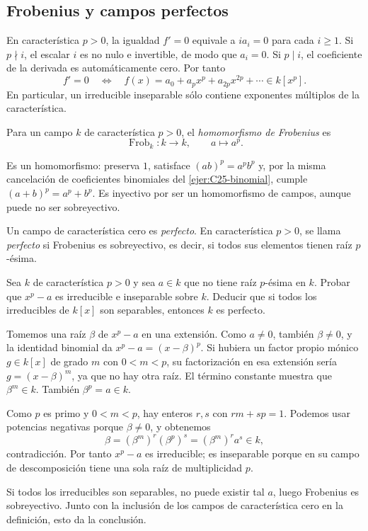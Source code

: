 \subsection{Frobenius y campos perfectos}\label{tema:25-3-1}\label{tema:25-3-2}
En característica $p>0$, la igualdad $f'=0$ equivale a $ia_i=0$ para cada $i\geq1$. Si $p\nmid i$, el escalar $i$ es no nulo e invertible, de modo que $a_i=0$. Si $p\mid i$, el coeficiente de la derivada es automáticamente cero. Por tanto
\[
f'=0\quad\Longleftrightarrow\quad
f(x)=a_0+a_px^p+a_{2p}x^{2p}+\cdots\in k[x^p].
\]
En particular, un irreducible inseparable sólo contiene exponentes múltiplos de la característica.

\begin{defi}
Para un campo $k$ de característica $p>0$, el \emph{homomorfismo de Frobenius} es
\[
\operatorname{Frob}_k:k\longrightarrow k,\qquad a\longmapsto a^p.
\]
\end{defi}
Es un homomorfismo: preserva $1$, satisface $(ab)^p=a^pb^p$ y, por la misma cancelación de coeficientes binomiales del \cref{ejer:C25-binomial}, cumple $(a+b)^p=a^p+b^p$. Es inyectivo por ser un homomorfismo de campos, aunque puede no ser sobreyectivo.

\begin{defi}
Un campo de característica cero es \emph{perfecto}. En característica $p>0$, se llama \emph{perfecto} si Frobenius es sobreyectivo, es decir, si todos sus elementos tienen raíz $p$-ésima.
\end{defi}

\begin{ejer}\label{ejer:C25-no-perfecto}
Sea $k$ de característica $p>0$ y sea $a\in k$ que no tiene raíz $p$-ésima en $k$. Probar que $x^p-a$ es irreducible e inseparable sobre $k$. Deducir que si todos los irreducibles de $k[x]$ son separables, entonces $k$ es perfecto.
\end{ejer}
\begin{sol}
Tomemos una raíz $\beta$ de $x^p-a$ en una extensión. Como $a\ne0$, también $\beta\ne0$, y la identidad binomial da $x^p-a=(x-\beta)^p$. Si hubiera un factor propio mónico $g\in k[x]$ de grado $m$ con $0<m<p$, su factorización en esa extensión sería $g=(x-\beta)^m$, ya que no hay otra raíz. El término constante muestra que $\beta^m\in k$. También $\beta^p=a\in k$.

Como $p$ es primo y $0<m<p$, hay enteros $r,s$ con $rm+sp=1$. Podemos usar potencias negativas porque $\beta\ne0$, y obtenemos
\[
\beta=(\beta^m)^r(\beta^p)^s=(\beta^m)^r a^s\in k,
\]
contradicción. Por tanto $x^p-a$ es irreducible; es inseparable porque en su campo de descomposición tiene una sola raíz de multiplicidad $p$.

Si todos los irreducibles son separables, no puede existir tal $a$, luego Frobenius es sobreyectivo. Junto con la inclusión de los campos de característica cero en la definición, esto da la conclusión.
\end{sol}

